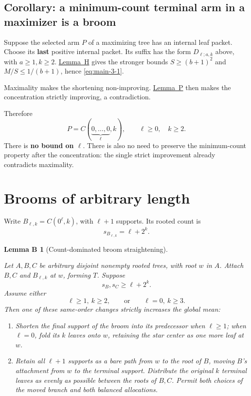 \documentclass[11pt,letterpaper]{article}
\providecommand{\tightlist}{\setlength{\itemsep}{0.12em}\setlength{\parskip}{0pt}}
\theoremstyle{plain}
\newtheorem*{broomlemma}{Lemma B}
\begin{document}
\subsection*{Corollary: a minimum-count terminal arm in a maximizer is a broom}\label{corollary-a-minimum-count-terminal-arm-in-a-maximizer-is-a-broom}

Suppose the selected arm \(P\) of a maximizing tree has an internal leaf packet. Choose its \textbf{last} positive internal packet. Its suffix has the form \(D_{\ell;a,k}\) above, with \(a\ge1,k\ge2\). \hyperref[lem:host]{Lemma~H} gives the stronger bounds \(S\ge(b+1)^2\) and \(M/S\le1/(b+1)\), hence \eqref{eq:main-3-1}.

Maximality makes the shortening non-improving. \hyperref[lem:packet]{Lemma~P} then makes the concentration strictly improving, a contradiction.

Therefore \[
\boxed{P=C(\underbrace{0,\ldots,0}_{\ell},k),\qquad \ell\ge0,\quad k\ge2.}
\tag{3.12}\label{eq:main-3-12}
\] There is \textbf{no bound on \(\ell\)}. There is also no need to preserve the minimum-count property after the concentration: the single strict improvement already contradicts maximality.

\section{Brooms of arbitrary length}\label{brooms-of-arbitrary-length}

Write \(B_{\ell,k}=C(0^{\ell},k)\), with \(\ell+1\) supports. Its rooted count is \[
s_{B_{\ell,k}}=\ell+2^k.
\]

\begin{broomlemma}[Count-dominated broom straightening]\label{lem:broom}

Let \(A,B,C\) be arbitrary disjoint nonempty rooted trees, with root \(w\) in \(A\). Attach \(B,C\) and \(B_{\ell,k}\) at \(w\), forming \(T\). Suppose \[
s_B,s_C\ge\ell+2^k.
\tag{4.1}\label{eq:main-4-1}
\] Assume either \[
\ell\ge1,\ k\ge2,
\qquad\text{or}\qquad
\ell=0,\ k\ge3.
\] Then one of these same-order changes strictly increases the global mean:

\begin{enumerate}
\def\labelenumi{\arabic{enumi}.}
\tightlist
\item
  Shorten the final support of the broom into its predecessor when \(\ell\ge1\); when \(\ell=0\), fold its \(k\) leaves onto \(w\), retaining the star center as one more leaf at \(w\).
\item
  Retain all \(\ell+1\) supports as a bare path from \(w\) to the root of \(B\), moving \(B\)'s attachment from \(w\) to the terminal support. Distribute the original \(k\) terminal leaves as evenly as possible between the roots of \(B,C\). Permit both choices of the moved branch and both balanced allocations.
\end{enumerate}

\end{broomlemma}
\end{document}
